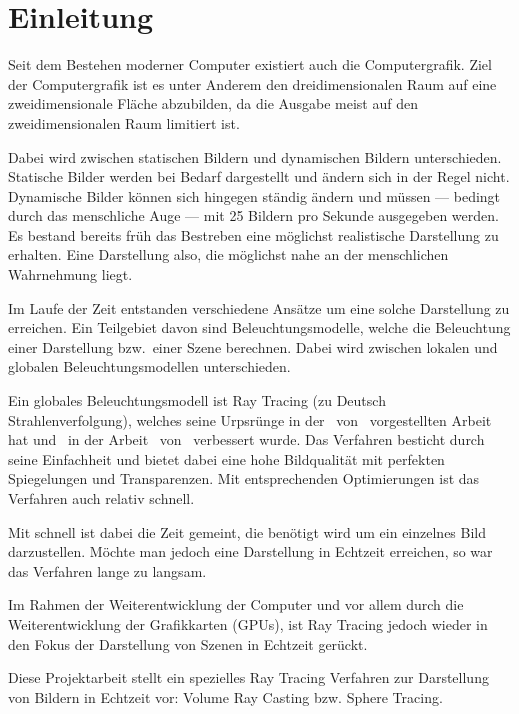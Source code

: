
\chapter{Einleitung}
\label{chap:10_introduction}

Seit dem Bestehen moderner Computer existiert auch die Computergrafik.
Ziel der Computergrafik ist es unter Anderem den dreidimensionalen Raum
auf eine zweidimensionale Fläche abzubilden, da die Ausgabe meist auf
den zweidimensionalen Raum limitiert ist.

Dabei wird zwischen statischen Bildern und dynamischen Bildern
unterschieden. Statische Bilder werden bei Bedarf dargestellt und ändern
sich in der Regel nicht. Dynamische Bilder können sich hingegen ständig
ändern und müssen --- bedingt durch das menschliche Auge --- mit 25
Bildern pro Sekunde ausgegeben werden. Es bestand bereits früh das
Bestreben eine möglichst realistische Darstellung zu erhalten. Eine
Darstellung also, die möglichst nahe an der menschlichen Wahrnehmung
liegt.

Im Laufe der Zeit entstanden verschiedene Ansätze um eine solche
Darstellung zu erreichen. Ein Teilgebiet davon sind Beleuchtungsmodelle,
welche die Beleuchtung einer Darstellung bzw.\ einer Szene berechnen.
Dabei wird zwischen lokalen und globalen Beleuchtungsmodellen
unterschieden.

Ein globales Beleuchtungsmodell ist Ray Tracing (zu Deutsch
Strahlenverfolgung), welches seine Urpsrünge in
der~\citeyear{appel_techniques_1968}
von~\citeauthor{appel_techniques_1968} vorgestellten
Arbeit~ hat
und~\citeyear{whitted_improved_1980} in der
Arbeit~
von~\citeauthor{whitted_improved_1980} verbessert wurde.  Das Verfahren
besticht durch seine Einfachheit und bietet dabei
eine hohe Bildqualität mit perfekten Spiegelungen und Transparenzen. Mit
entsprechenden Optimierungen ist das Verfahren auch relativ schnell.

Mit schnell ist dabei die Zeit gemeint, die benötigt wird um ein
einzelnes Bild darzustellen. Möchte man jedoch eine Darstellung in
Echtzeit erreichen, so war das Verfahren lange zu langsam.

Im Rahmen der Weiterentwicklung der Computer und vor allem durch die
Weiterentwicklung der Grafikkarten (GPUs), ist Ray Tracing jedoch wieder
in den Fokus der Darstellung von Szenen in Echtzeit gerückt.

Diese Projektarbeit stellt ein spezielles Ray Tracing Verfahren zur
Darstellung von Bildern in Echtzeit vor: Volume Ray Casting bzw. Sphere
Tracing.
